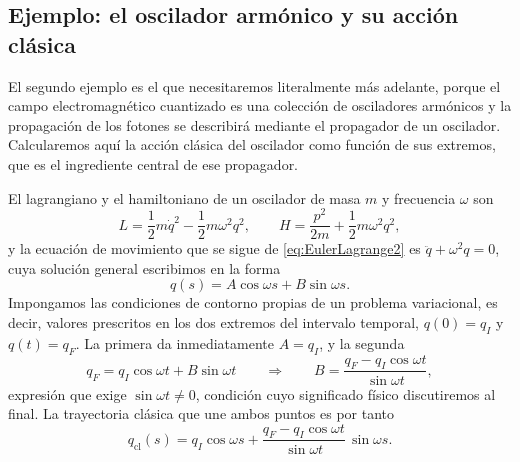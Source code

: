     \subsection{Ejemplo: el oscilador armónico y su acción clásica}

        El segundo ejemplo es el que necesitaremos literalmente más adelante, porque el campo electromagnético cuantizado es una colección de osciladores armónicos y la propagación de los fotones se describirá mediante el propagador de un oscilador. Calcularemos aquí la acción clásica del oscilador como función de sus extremos, que es el ingrediente central de ese propagador.

        El lagrangiano y el hamiltoniano de un oscilador de masa $m$ y frecuencia $\omega$ son
        \begin{equation}\label{eq:LagrangianoOsc}
            L = \frac{1}{2}m\dot{q}^{2} - \frac{1}{2}m\omega^{2}q^{2},
            \qquad
            H = \frac{p^{2}}{2m} + \frac{1}{2}m\omega^{2}q^{2},
        \end{equation}
        y la ecuación de movimiento que se sigue de \eqref{eq:EulerLagrange2} es $\ddot{q} + \omega^{2}q = 0$, cuya solución general escribimos en la forma
        \begin{equation}\label{eq:SolucionOsc}
            q(s) = A\cos\omega s + B\sin\omega s .
        \end{equation}
        Impongamos las condiciones de contorno propias de un problema variacional, es decir, valores prescritos en los dos extremos del intervalo temporal, $q(0) = q_{I}$ y $q(t) = q_{F}$. La primera da inmediatamente $A = q_{I}$, y la segunda
        \begin{equation}\label{eq:CondicionB}
            q_{F} = q_{I}\cos\omega t + B\sin\omega t
            \qquad\Longrightarrow\qquad
            B = \frac{q_{F} - q_{I}\cos\omega t}{\sin\omega t},
        \end{equation}
        expresión que exige $\sin\omega t \neq 0$, condición cuyo significado físico discutiremos al final. La trayectoria clásica que une ambos puntos es por tanto
        \begin{equation}\label{eq:TrayectoriaOsc}
            q_{\mathrm{cl}}(s) = q_{I}\cos\omega s + \frac{q_{F} - q_{I}\cos\omega t}{\sin\omega t}\,\sin\omega s .
        \end{equation}

